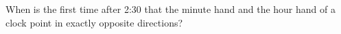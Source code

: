 When is the first time after 2:30 that the minute hand and the hour hand of a clock point in exactly opposite directions?
